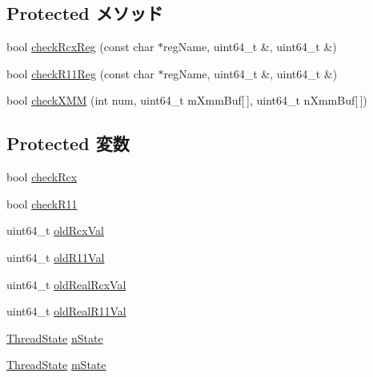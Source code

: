 \subsection*{Protected メソッド}
\begin{DoxyCompactItemize}
\item 
bool \hyperlink{classTrace_1_1X86NativeTrace_a3b44534ea889f35c16accfb8c67bee63}{checkRcxReg} (const char $\ast$regName, uint64\_\-t \&, uint64\_\-t \&)
\item 
bool \hyperlink{classTrace_1_1X86NativeTrace_a71ac25d49cd03430b8d3b773ed04ddbc}{checkR11Reg} (const char $\ast$regName, uint64\_\-t \&, uint64\_\-t \&)
\item 
bool \hyperlink{classTrace_1_1X86NativeTrace_a1e5c8f953a4bd6df5c37ce64ad70e2fe}{checkXMM} (int num, uint64\_\-t mXmmBuf\mbox{[}$\,$\mbox{]}, uint64\_\-t nXmmBuf\mbox{[}$\,$\mbox{]})
\end{DoxyCompactItemize}
\subsection*{Protected 変数}
\begin{DoxyCompactItemize}
\item 
bool \hyperlink{classTrace_1_1X86NativeTrace_a4d4ab0009530e0c7cbb09d6c4a1a2beb}{checkRcx}
\item 
bool \hyperlink{classTrace_1_1X86NativeTrace_a1fbc4b221078d00768571267f930e6a4}{checkR11}
\item 
uint64\_\-t \hyperlink{classTrace_1_1X86NativeTrace_a4d5ab35e2c67c65a1aa5245272177962}{oldRcxVal}
\item 
uint64\_\-t \hyperlink{classTrace_1_1X86NativeTrace_ad476adc78d5c3b311dee50de3d0d0d2c}{oldR11Val}
\item 
uint64\_\-t \hyperlink{classTrace_1_1X86NativeTrace_a8b25e7523e18835b059948c858936dd2}{oldRealRcxVal}
\item 
uint64\_\-t \hyperlink{classTrace_1_1X86NativeTrace_a9a98c7db1b30cd8d2501a91344160a3e}{oldRealR11Val}
\item 
\hyperlink{structTrace_1_1X86NativeTrace_1_1ThreadState}{ThreadState} \hyperlink{classTrace_1_1X86NativeTrace_a9b1e159170b558aeaa3694f2183d4d68}{nState}
\item 
\hyperlink{structTrace_1_1X86NativeTrace_1_1ThreadState}{ThreadState} \hyperlink{classTrace_1_1X86NativeTrace_a72f1181d2c4bc9244a9bea747b68881f}{mState}
\end{DoxyCompactItemize}


